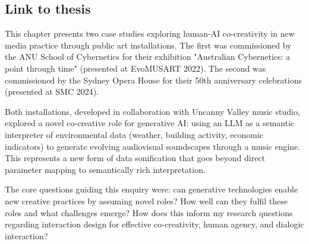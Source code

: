 \subsection{Link to thesis}
This chapter presents two case studies exploring human-AI co-creativity in new media practice through public art installations. The first was commissioned by the ANU School of Cybernetics for their exhibition "Australian Cybernetics: a point through time" (presented at EvoMUSART 2022). The second was commissioned by the Sydney Opera House for their 50th anniversary celebrations (presented at SMC 2024).

Both installations, developed in collaboration with Uncanny Valley music studio, explored a novel co-creative role for generative AI: using an LLM as a semantic interpreter of environmental data (weather, building activity, economic indicators) to generate evolving audiovisual soundscapes through a music engine. This represents a new form of data sonification that goes beyond direct parameter mapping to semantically rich interpretation.

The core questions guiding this enquiry were: can generative technologies enable new creative practices by assuming novel roles? How well can they fulfil these roles and what challenges emerge? How does this inform my research questions regarding interaction design for effective co-creativity, human agency, and dialogic interaction?